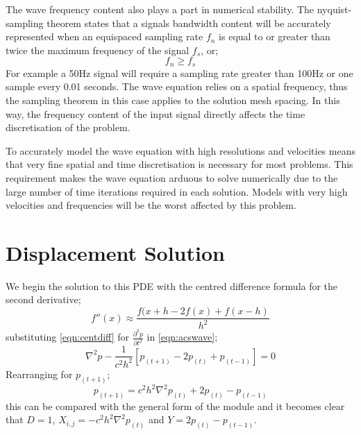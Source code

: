 The wave frequency content also plays a part in numerical stability. The
nyquist-sampling theorem states that a signals bandwidth content will be
accurately represented when an equispaced sampling rate $f _{n}$ is
equal to or greater than twice the maximum frequency of the signal
$f_{s}$, or;
\begin{equation} \label{eqn:samptheorem}
 f_{n} \geqslant f_{s}
\end{equation}
For example a 50Hz signal will require a sampling rate greater than 100Hz or
one sample every 0.01 seconds. The wave equation relies on a spatial frequency,
thus the sampling theorem in this case applies to the solution mesh spacing. In
this way, the frequency content of the input signal directly affects the time
discretisation of the problem.  

To accurately model the wave equation with high resolutions and velocities
means that very fine spatial and time discretisation is necessary for most
problems.
This requirement makes the wave equation arduous to
solve numerically due to the large number of time iterations required in each
solution. Models with very high velocities and frequencies will be the worst
affected by this problem.

\section{Displacement Solution}

We begin the solution to this PDE with the centred difference formula for the
second derivative;
\begin{equation}
 f''(x) \approx \frac{f(x+h - 2f(x) + f(x-h)}{h^2}
\label{eqn:centdiff}
\end{equation}
substituting \autoref{eqn:centdiff} for $\frac{\partial ^2 p }{\partial t ^2}$
in \autoref{eqn:acswave};
\begin{equation}
 \nabla ^2 p - \frac{1}{c^2h^2} \left[p_{(t+1)} - 2p_{(t)} +
p_{(t-1)} \right]
= 0
\label{eqn:waveu}
\end{equation}
Rearranging for $p_{(t+1)}$;
\begin{equation}
 p_{(t+1)} = c^2 h^2 \nabla ^2 p_{(t)} +2p_{(t)} -
p_{(t-1)}
\end{equation}
this can be compared with the general form of the \modLPDE module and it
becomes clear that $D=1$, $X_{i,j}=-c^2 h^2 \nabla ^2 p_{(t)}$ and
$Y=2p_{(t)} - p_{(t-1)}$.

